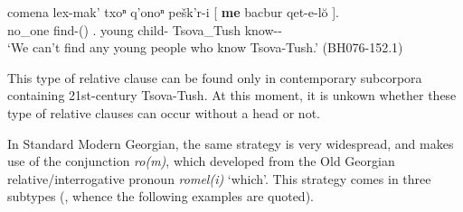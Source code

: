 	\begin{exe}
		\ex\label{relme-ex4}
		\gll comena	lex-mak'	txoⁿ	q'onoⁿ	pešk'r-i	{{\normalfont[} \textbf{me}}	bacbur	{qet-e-l\u{o} {\normalfont]}}.   \\
		no\_one	find-{\Pot}({\Npst})	{\Fpl}.{\Dat}	young	child-{\Pl}	\textbf{{\Subord}}	Tsova\_Tush	know-{\Npst}-{\Sbjv}  \\
		\trans `We can’t find any young people who know Tsova-Tush.’
		\hfill (BH076-152.1)
	\end{exe}


This type of relative clause can be found only in contemporary subcorpora containing 21st-century Tsova-Tush.
At this moment, it is unkown whether these type of relative clauses can occur without a head or not.

In Standard Modern Georgian, the same strategy is very widespread, and makes use of the conjunction \textit{ro(m)}, which developed from the Old Georgian relative/interrogative pronoun \textit{romel(i)} ‘which’. This strategy comes in three subtypes (\cite{harris1994rel}, whence the following examples are quoted). 

